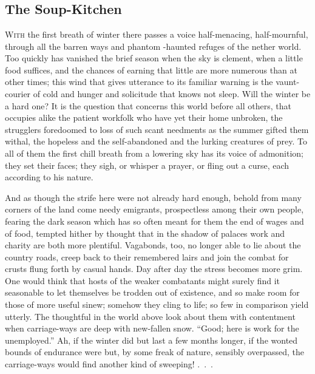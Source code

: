 \part{}

\chapter{The Soup-Kitchen}

\textsc{With} the first breath of winter there passes a voice
half-menacing, half-mournful, through all the barren ways and phantom
-haunted refuges of the nether world. Too quickly has vanished the brief
season when the sky is clement, when a little food suffices, and the
chances of earning that little are more numerous than at other times;
this wind that gives utterance to its familiar warning is the
vaunt-courier of cold and hunger and solicitude that knows not sleep.
Will the winter be a hard one? It is the question that concerns this
world before all others, that occupies alike the patient workfolk who
have yet their home unbroken, the strugglers foredoomed to loss of such
scant needments as the summer gifted {}them withal, the hopeless and the
self-abandoned and the lurking creatures of prey. To all of them the
first chill breath from a lowering sky has its voice of admonition; they
set their faces; they sigh, or whisper a prayer, or fling out a curse,
each according to his nature.

And as though the strife here were not already hard enough, behold from
many corners of the land come needy emigrants, prospectless among their
own people, fearing the dark season which has so often meant for them
the end of wages and of food, tempted hither by thought that in the
shadow of palaces work and charity are both more plentiful. Vagabonds,
too, no longer able to lie about the country roads, creep back to their
remembered lairs and join the combat for crusts flung forth by casual
hands. Day after day the stress becomes more grim. One would think that
hosts of the weaker combatants might surely find it seasonable to let
themselves be trodden out of existence, and so make room for those of
more useful sinew; somehow they cling to life; so few in comparison
yield utterly. The thoughtful in the world above look about them with
contentment when carriage-ways are deep {}with new-fallen snow. ``Good;
here is work for the unemployed.'' Ah, if the winter did but last a few
months longer, if the wonted bounds of endurance were but, by some freak
of nature, sensibly overpassed, the carriage-ways would find another
kind of {sweeping! {.~.~.}}

